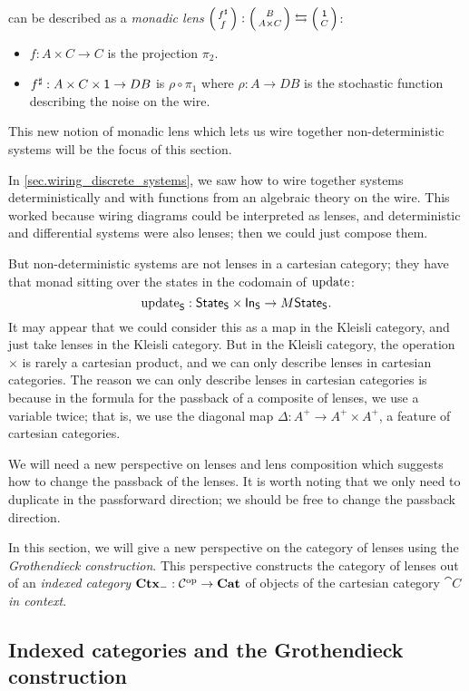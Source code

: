 \documentclass[DynamicalBook]{subfiles}
\begin{document}
can be described as a \emph{monadic lens} $\lens{f^{\sharp}}{f} : \lens{B}{A
  \times C} \fromto \lens{\ord{1}}{C}$:
\begin{itemize}
\item $f : A \times C \to C$ is the projection $\pi_2$.
\item $f^{\sharp}: A \times C \times \mathsf{1} \to D B$ is $\rho \circ \pi_1$ where $\rho : A \to
  D B$ is the stochastic function describing the noise on the wire.
\end{itemize}
This new notion of monadic lens which lets us wire together non-deterministic
systems will be the focus of this section.

In \cref{sec.wiring_discrete_systems}, we saw how to wire together systems
deterministically and with functions from an algebraic theory on the wire. This
worked because wiring diagrams could be interpreted as lenses, and deterministic
and differential systems were also lenses; then we could just compose them.

But non-deterministic systems are not lenses in a cartesian category; they have
that monad sitting over the states in the codomain of $\mathrm{update}_{\mathsf{}}$:
\[
\mathrm{update}_{\mathsf{S}} : \mathsf{State}_{\mathsf{S}} \times \mathsf{In}_{\mathsf{S}} \to M \mathsf{State}_{\mathsf{S}}.
\]
It may appear that we could consider this as a map in the Kleisli category, and
just take lenses in the Kleisli category. But in the Kleisli category, the
operation $\times$ is rarely a cartesian product, and we can only describe
lenses in cartesian categories. The reason we can only describe lenses in
cartesian categories is because in the formula for the passback of a composite
of lenses, we use a variable twice; that is, we use the diagonal map $\Delta : A^+ \to
A^+ \times A^+$, a feature of cartesian categories. 


We will need a new perspective on lenses and
lens composition which suggests how to change the passback of the lenses. It is
worth noting that we only need to duplicate in the passforward direction; we
should be free to change the passback direction.

In this section, we will give a new perspective on the category of lenses using
the \emph{Grothendieck construction}. This perspective constructs the category
of lenses out of an \emph{indexed category} $\textbf{Ctx}_{-} : \mathcal{C}^{\textnormal{op}} \to
\textbf{Cat}$ of objects of the cartesian category $\cat{C}$ \emph{in context}. 




\subsection{Indexed categories and the Grothendieck construction}\label{sec.indexed_categories}
\end{document}
